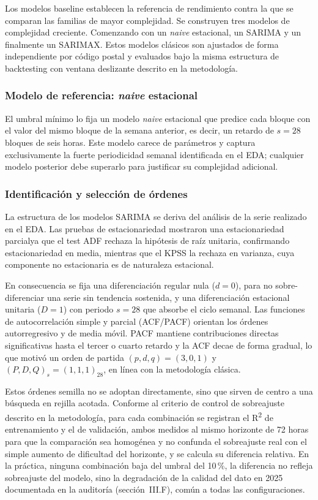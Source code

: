 \documentclass[12pt, a4paper]{article}
\begin{document}
Los modelos baseline establecen la referencia de rendimiento contra la que se comparan las familias de mayor complejidad. Se construyen tres modelos de complejidad creciente. Comenzando con un \textit{naive} estacional, un SARIMA y un finalmente un SARIMAX. Estos modelos clásicos son ajustados de forma independiente por código postal y evaluados bajo la misma estructura de backtesting con ventana deslizante descrito en la metodología.

\subsubsection{Modelo de referencia: \textit{naive} estacional}

El umbral mínimo lo fija un modelo \textit{naive} estacional que predice cada bloque con el valor del mismo bloque de la semana anterior, es decir, un retardo de $s=28$ bloques de seis horas. Este modelo carece de parámetros y captura exclusivamente la fuerte periodicidad semanal identificada en el EDA; cualquier modelo posterior debe superarlo para justificar su complejidad adicional.

\subsubsection{Identificación y selección de órdenes}

La estructura de los modelos SARIMA se deriva del análisis de la serie realizado en el EDA. Las pruebas de estacionariedad mostraron  una estacionariedad parcialya que el test ADF rechaza la hipótesis de raíz unitaria, confirmando estacionariedad en media, mientras que el KPSS la rechaza en varianza, cuya componente no estacionaria es de naturaleza estacional. 

En consecuencia se fija una diferenciación regular nula ($d=0$), para no sobre-diferenciar una serie sin tendencia sostenida, y una diferenciación estacional unitaria ($D=1$) con periodo $s=28$ que absorbe el ciclo semanal. Las funciones de autocorrelación simple y parcial (ACF/PACF) orientan los órdenes autorregresivo y de media móvil.  PACF mantiene contribuciones directas significativas hasta el tercer o cuarto retardo y la ACF decae de forma gradual, lo que motivó  un orden de partida $(p,d,q)=(3,0,1)$ y $(P,D,Q)_s=(1,1,1)_{28}$, en línea con la metodología clásica.

Estos órdenes semilla no se adoptan directamente, sino que sirven de centro a una búsqueda en rejilla acotada. Conforme al criterio de control de sobreajuste descrito en la metodología, para cada combinación se registran el R\textsuperscript{2} de entrenamiento y el de validación, ambos medidos al mismo horizonte de 72 horas para que la comparación sea homogénea y no confunda el sobreajuste real con el simple aumento de dificultad del horizonte, y se calcula su diferencia relativa. En la práctica, ninguna combinación baja del umbral del 10\,\%,  la diferencia no refleja sobreajuste del modelo, sino la degradación de la calidad del dato en 2025 documentada en la auditoría (sección~III.F), común a todas las configuraciones.
\end{document}
